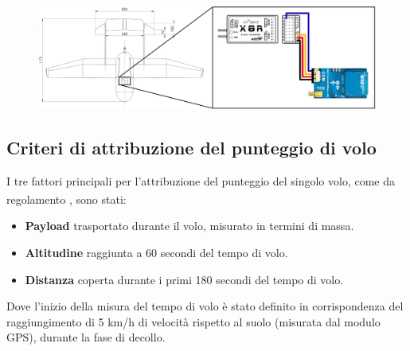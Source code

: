 \documentclass[12pt]{article}
\begin{document}
\begin{figure}[H]
	\centering
	\includegraphics[width=14cm]{img/Schema-v1}
\end{figure}

\subsection*{Criteri di attribuzione del punteggio di volo}
I tre fattori principali per l'attribuzione del punteggio del singolo volo, come da regolamento \textsuperscript{\cite{regulation}}, sono stati:
\begin{itemize}
\item \textbf{Payload} trasportato durante il volo, misurato in termini di massa.
\item \textbf{Altitudine} raggiunta a 60 secondi del tempo di volo.
\item \textbf{Distanza} coperta durante i primi 180 secondi del tempo di volo.
\end{itemize}
Dove l'inizio della misura del tempo di volo è stato definito in corrispondenza del raggiungimento di 5 km/h di velocità rispetto al suolo (misurata dal modulo GPS), durante la fase di decollo.

\newpage


\end{document}
